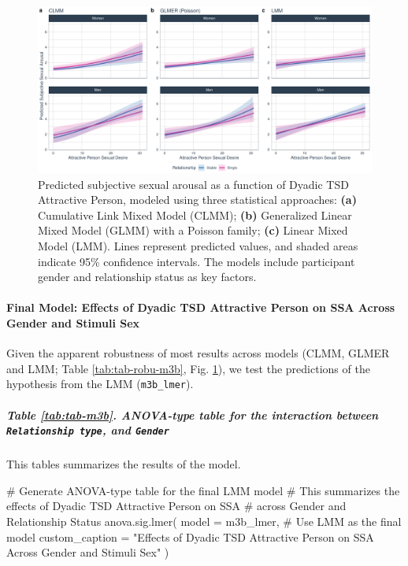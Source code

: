 \documentclass[
  bookmarksnumbered]{article}
\newenvironment{Shaded}{\begin{snugshade}}{\end{snugshade}}
\newcommand{\AttributeTok}[1]{\textcolor[rgb]{0.80,0.80,0.80}{#1}}
\newcommand{\CommentTok}[1]{\textcolor[rgb]{0.50,0.62,0.50}{#1}}
\newcommand{\FunctionTok}[1]{\textcolor[rgb]{0.94,0.94,0.56}{#1}}
\newcommand{\NormalTok}[1]{\textcolor[rgb]{0.80,0.80,0.80}{#1}}
\newcommand{\StringTok}[1]{\textcolor[rgb]{0.80,0.58,0.58}{#1}}
\begin{document}
\begin{figure}
\centering
\includegraphics{Sexual_Desire_Arousal_anonymous_files/figure-latex/preds-m3b-1.pdf}
\caption{\label{fig:preds-m3b}Predicted subjective sexual arousal as a function of Dyadic TSD Attractive Person, modeled using three statistical approaches: \textbf{(a)} Cumulative Link Mixed Model (CLMM); \textbf{(b)} Generalized Linear Mixed Model (GLMM) with a Poisson family; \textbf{(c)} Linear Mixed Model (LMM). Lines represent predicted values, and shaded areas indicate 95\% confidence intervals. The models include participant gender and relationship status as key factors.}
\end{figure}

\paragraph{Final Model: Effects of Dyadic TSD Attractive Person on SSA Across Gender and Stimuli Sex}\label{final-model-effects-of-dyadic-tsd-attractive-person-on-ssa-across-gender-and-stimuli-sex-1}

Given the apparent robustness of most results across models (CLMM, GLMER and LMM; Table \ref{tab:tab-robu-m3b}, Fig. \ref{fig:preds-m3b}), we test the predictions of the hypothesis from the LMM (\texttt{m3b\_lmer}).

\subparagraph{\texorpdfstring{Table \ref{tab:tab-m3b}. ANOVA-type table for the interaction between \texttt{Relationship\ type}, and \texttt{Gender}}{Table \ref{tab:tab-m3b}. ANOVA-type table for the interaction between Relationship type, and Gender}}\label{table-reftabtab-m3b.-anova-type-table-for-the-interaction-between-relationship-type-and-gender}

This tables summarizes the results of the model.

\begin{Shaded}
\begin{Highlighting}[]
\CommentTok{\# Generate ANOVA{-}type table for the final LMM model}
\CommentTok{\# This summarizes the effects of Dyadic TSD Attractive Person on SSA}
\CommentTok{\# across Gender and Relationship Status}
\FunctionTok{anova.sig.lmer}\NormalTok{(}
  \AttributeTok{model =}\NormalTok{ m3b\_lmer, }\CommentTok{\# Use LMM as the final model}
  \AttributeTok{custom\_caption =} \StringTok{"Effects of Dyadic TSD Attractive Person on SSA }
\StringTok{  Across Gender and Stimuli Sex"}
\NormalTok{)}
\end{Highlighting}
\end{Shaded}
\end{document}
